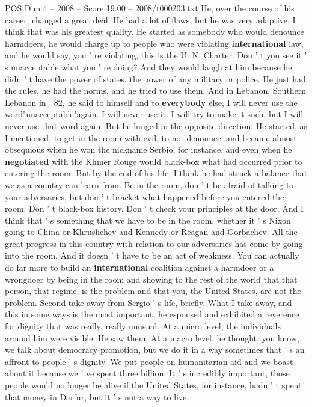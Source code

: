 \begin{textsample}{POS Dim 4 – 2008 – Score 19.00 – 2008/t000203.txt}
He, over the course of his career, changed a great deal.
He had a lot of flaws, but he was very adaptive.
I think that was his greatest quality.
He started as somebody who would denounce harmdoers, he would charge up to people who were violating \textbf{international} law, and he would say, you ' re violating, this is the U.
N.
Charter.
Don ' t you see it ' s unacceptable what you ' re doing?
And they would laugh at him because he didn ' t have the power of states, the power of any military or police.
He just had the rules, he had the norms, and he tried to use them.
And in Lebanon, Southern Lebanon in ' 82, he said to himself and to \textbf{everybody} else, I will never use the word"unacceptable"again.
I will never use it.
I will try to make it such, but I will never use that word again.
But he lunged in the opposite direction.
He started, as I mentioned, to get in the room with evil, to not denounce, and became almost obsequious when he won the nickname Serbio, for instance, and even when he \textbf{negotiated} with the Khmer Rouge would black-box what had occurred prior to entering the room.
But by the end of his life, I think he had struck a balance that we as a country can learn from.
Be in the room, don ' t be afraid of talking to your adversaries, but don ' t bracket what happened before you entered the room.
Don ' t black-box history.
Don ' t check your principles at the door.
And I think that ' s something that we have to be in the room, whether it ' s Nixon going to China or Khrushchev and Kennedy or Reagan and Gorbachev.
All the great progress in this country with relation to our adversaries has come by going into the room.
And it doesn ' t have to be an act of weakness.
You can actually do far more to build an \textbf{international} coalition against a harmdoer or a wrongdoer by being in the room and showing to the rest of the world that that person, that regime, is the problem and that you, the United States, are not the problem.
Second take-away from Sergio ' s life, briefly.
What I take away, and this in some ways is the most important, he espoused and exhibited a reverence for dignity that was really, really unusual.
At a micro level, the individuals around him were visible.
He saw them.
At a macro level, he thought, you know, we talk about democracy promotion, but we do it in a way sometimes that ' s an affront to people ' s dignity.
We put people on humanitarian aid and we boast about it because we ' ve spent three billion.
It ' s incredibly important, those people would no longer be alive if the United States, for instance, hadn ' t spent that money in Darfur, but it ' s not a way to live.

\end{textsample}
